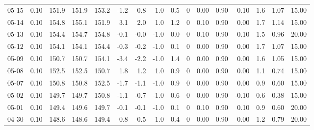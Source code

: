 \begin{threeparttable}
{\begin{tabular}{lrrrrrrrrrrrrrrr}
  05-15 &     0.10 & 151.9 & 151.9 & 153.2 &       -1.2 &           -0.8 &                     -1.0 &                 0.5 &              0 &       0.00 &      0.90 &          -0.10 &              1.6 &            1.07 &                  15.00 \\
  05-14 &     0.10 & 154.8 & 155.1 & 151.9 &        3.1 &            2.0 &                      1.0 &                 1.2 &              0 &       0.10 &      0.90 &           0.00 &              1.7 &            1.14 &                  15.00 \\
  05-13 &     0.10 & 154.4 & 154.7 & 154.8 &       -0.1 &           -0.0 &                     -1.0 &                 0.0 &              0 &       0.10 &      0.90 &           0.10 &              1.5 &            0.96 &                  20.00 \\
  05-12 &     0.10 & 154.1 & 154.1 & 154.4 &       -0.3 &           -0.2 &                     -1.0 &                 0.1 &              0 &       0.00 &      0.90 &           0.00 &              1.7 &            1.07 &                  15.00 \\
  05-09 &     0.10 & 150.7 & 150.7 & 154.1 &       -3.4 &           -2.2 &                     -1.0 &                 1.4 &              0 &       0.00 &      0.90 &           0.00 &              1.6 &            1.05 &                  15.00 \\
  05-08 &     0.10 & 152.5 & 152.5 & 150.7 &        1.8 &            1.2 &                      1.0 &                 0.9 &              0 &       0.00 &      0.90 &           0.00 &              1.1 &            0.74 &                  15.00 \\
  05-07 &     0.10 & 150.8 & 150.8 & 152.5 &       -1.7 &           -1.1 &                     -1.0 &                 0.9 &              0 &       0.00 &      0.90 &           0.00 &              0.9 &            0.60 &                  15.00 \\
  05-02 &     0.10 & 149.7 & 149.7 & 150.8 &       -1.1 &           -0.7 &                     -1.0 &                 0.6 &              0 &       0.00 &      0.90 &          -0.10 &              0.6 &            0.38 &                  15.00 \\
  05-01 &     0.10 & 149.4 & 149.6 & 149.7 &       -0.1 &           -0.1 &                     -1.0 &                 0.1 &              0 &       0.10 &      0.90 &           0.10 &              0.9 &            0.60 &                  20.00 \\
  04-30 &     0.10 & 148.6 & 148.6 & 149.4 &       -0.8 &           -0.5 &                     -1.0 &                 0.4 &              0 &       0.00 &      0.90 &           0.00 &              1.2 &            0.79 &                  20.00 \\

\end{tabular}}
\end{threeparttable}
